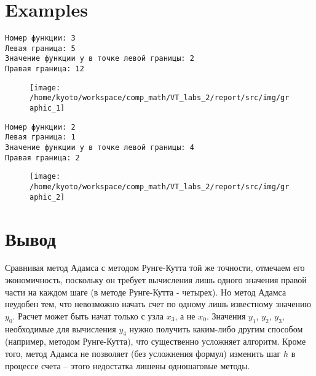 \section{Examples}
\begin{verbatim}
Номер функции: 3
Левая граница: 5
Значение функции y в точке левой границы: 2
Правая граница: 12
\end{verbatim}
\begin{figure}[h]
    \texttt{[image: /home/kyoto/workspace/comp\_math/VT\_labs\_2/report/src/img/graphic\_1]}
\end{figure}


\begin{verbatim}
Номер функции: 2
Левая граница: 1
Значение функции y в точке левой границы: 4
Правая граница: 2
\end{verbatim}
\begin{figure}[h]
    \texttt{[image: /home/kyoto/workspace/comp\_math/VT\_labs\_2/report/src/img/graphic\_2]}
\end{figure}

\section{Вывод}
Сравнивая метод Адамса с методом Рунге-Кутта той же точности, отмечаем его экономичность, поскольку он требует вычисления лишь одного значения правой
части на каждом шаге (в методе Рунге-Кутта - четырех). Но метод Адамса неудобен тем, что невозможно начать счет по одному лишь известному значению $y_0$.
Расчет может быть начат только с узла $x_3$, а не $x_0$. Значения $y_1$, $y_2$, $y_3$, необходимые для вычисления $y_4$ нужно получить каким-либо другим
способом (например, методом Рунге-Кутта), что существенно усложняет алгоритм. Кроме того, метод Адамса не позволяет (без усложнения формул) изменить
шаг $h$ в процессе счета -- этого недостатка лишены одношаговые методы.